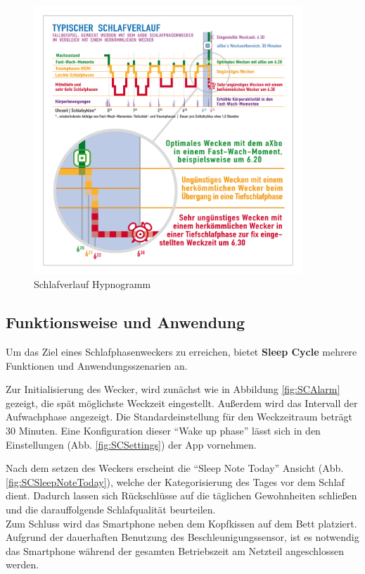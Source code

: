 \begin{figure}[H]
 \centering
 \includegraphics[width=0.9\textwidth]{images/aXbo_Schlafverlauf_Hypnogramm_DE.png}
 \caption{Schlafverlauf Hypnogramm \cite{fig:Hypnogramm}}
 \label{fig:Hypnogramm}
\end{figure}


\subsection{Funktionsweise und Anwendung}
\label{ch:Apps:sec:Sleepcycle:subsec:FuA}

Um das Ziel eines Schlafphasenweckers zu erreichen, bietet \textbf{Sleep Cycle} mehrere Funktionen und Anwendungsszenarien an.

Zur Initialisierung des Wecker, wird zunächst wie in Abbildung \ref{fig:SCAlarm} gezeigt, die spät möglichste Weckzeit eingestellt.
Außerdem wird das Intervall der Aufwachphase angezeigt.
Die Standardeinstellung für den Weckzeitraum beträgt 30 Minuten.
Eine Konfiguration dieser "`Wake up phase"' lässt sich in den Einstellungen (Abb. \ref{fig:SCSettings}) der App vornehmen.

Nach dem setzen des Weckers erscheint die "`Sleep Note Today"' Ansicht (Abb. \ref{fig:SCSleepNoteToday}), welche der Kategorisierung des Tages vor dem Schlaf dient. Dadurch lassen sich Rückschlüsse auf die täglichen Gewohnheiten schließen und die darauffolgende Schlafqualität beurteilen. \\
Zum Schluss wird das Smartphone neben dem Kopfkissen auf dem Bett platziert.
Aufgrund der dauerhaften Benutzung des Beschleunigungssensor, ist es notwendig das Smartphone während der gesamten Betriebszeit am Netzteil angeschlossen werden.


